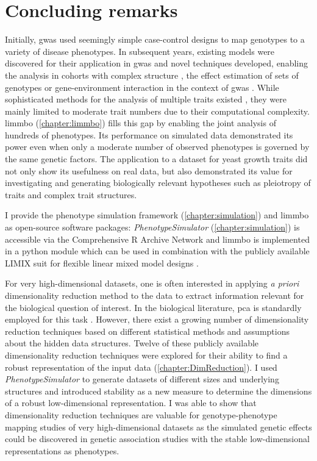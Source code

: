 \chapter{Concluding remarks}
Initially, \gls{gwas} used seemingly simple case-control designs to map genotypes to a variety of disease phenotypes. In subsequent years, existing models were discovered for their application in \gls{gwas} \citep{Korte2012} and novel techniques developed, enabling the analysis in cohorts with complex structure \citep{Yu2006,Kang2010}, the effect estimation of sets of genotypes \citep{Wu2010,Casale2015} or gene-environment interaction in the context of \gls{gwas} \citep{Casale2017}. While sophisticated methods for the analysis of multiple traits existed \citep{Korte2012,Zhou2012,Casale2015}, they were mainly limited to moderate trait numbers due to their computational complexity. \gls{limmbo} (\cref{chapter:limmbo}) fills this gap by enabling the joint analysis of hundreds of phenotypes.  Its performance on simulated data demonstrated its power even when only a moderate number of observed phenotypes is governed by the same genetic factors. The application to a dataset for yeast growth traits did not only show its usefulness on real data, but also demonstrated its value for investigating and generating biologically relevant hypotheses such as pleiotropy of traits and complex trait structures. 

I provide the phenotype simulation framework (\cref{chapter:simulation}) and \gls{limmbo} as open-source software packages: \textit{PhenotypeSimulator} (\cref{chapter:simulation}) is accessible via the Comprehensive R Archive Network \citep{Meyer2017} and \gls{limmbo} is implemented in a python module which can be used in combination with the publicly available LIMIX suit for flexible linear mixed model designs \citep{Lippert2014}.

For very high-dimensional datasets, one is often interested in applying \textit{a priori} dimensionality reduction method to the data to extract information relevant for the biological question of interest. In the biological literature, \gls{pca} is standardly employed for this task \citep{Avery2011,Liu2012,Zhang2012}. However, there exist a growing number of dimensionality reduction techniques based on different statistical methods and assumptions about the hidden data structures. Twelve of these publicly available dimensionality reduction techniques were explored for their ability to find a robust representation of the input data (\cref{chapter:DimReduction}). I used \textit{PhenotypeSimulator} to generate datasets of different sizes and underlying structures and introduced stability as a new measure to determine the dimensions of a robust low-dimensional representation. I was able to show that dimensionality reduction techniques are valuable for genotype-phenotype mapping studies of very high-dimensional datasets as the simulated genetic effects could be discovered in genetic association studies with the stable low-dimensional representations as phenotypes.

